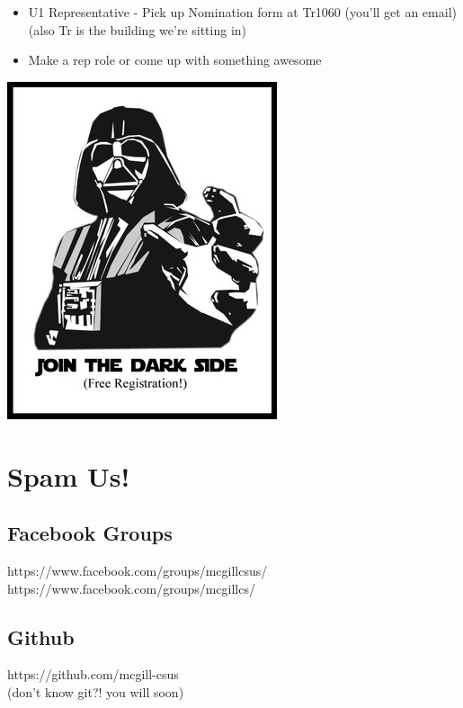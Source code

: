 \begin{multicols}{2}
\begin{itemize}
	\item U1 Representative - Pick up Nomination form at Tr1060 (you'll get an email) (also Tr is the building we're sitting in)
	\item Make a rep role or come up with something awesome
\end{itemize}
\includegraphics[width=.4\textwidth]{gfx/darkside.jpg}
\end{multicols}

\clearpage

\section{Spam Us!}

\subsection{Facebook Groups}

https://www.facebook.com/groups/mcgillcsus/ \\
https://www.facebook.com/groups/mcgillcs/

\subsection{Github}

https://github.com/mcgill-csus \\
(don't know git?!  you will soon)

\clearpage

	
